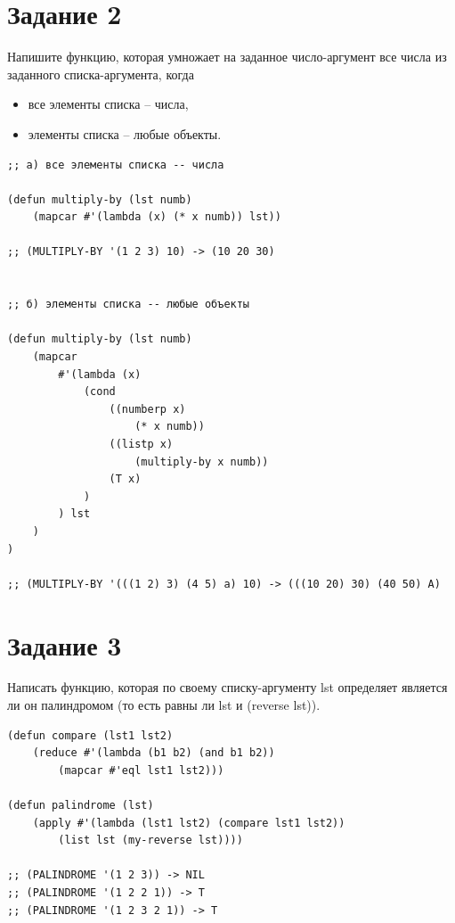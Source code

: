\documentclass[a4paper,14pt, unknownkeysallowed]{extreport}
\begin{document}
\section{Задание 2}

Напишите функцию, которая умножает на заданное число-аргумент все числа из заданного списка-аргумента, когда

\begin{itemize}
	\item все элементы списка -- числа,
	\item элементы списка -- любые объекты.
\end{itemize}

\begin{center}
\captionsetup{justification=raggedright,singlelinecheck=off}
\begin{lstlisting}[label=lst:parallel_processing,caption=Решение задания 2]
;; a) все элементы списка -- числа

(defun multiply-by (lst numb)
	(mapcar #'(lambda (x) (* x numb)) lst))

;; (MULTIPLY-BY '(1 2 3) 10) -> (10 20 30)


;; б) элементы списка -- любые объекты

(defun multiply-by (lst numb)
    (mapcar 
        #'(lambda (x) 
            (cond 
                ((numberp x)
                    (* x numb))
                ((listp x)
                    (multiply-by x numb))
                (T x)
            )
        ) lst
    )
)

;; (MULTIPLY-BY '(((1 2) 3) (4 5) a) 10) -> (((10 20) 30) (40 50) A)
\end{lstlisting}
\end{center}

\section{Задание 3}

Написать функцию, которая по своему списку-аргументу lst определяет является ли он палиндромом (то есть равны ли lst и (reverse lst)).

\begin{center}
\captionsetup{justification=raggedright,singlelinecheck=off}
\begin{lstlisting}[label=lst:parallel_processing,caption=Решение задания 3]
(defun compare (lst1 lst2)
    (reduce #'(lambda (b1 b2) (and b1 b2)) 
        (mapcar #'eql lst1 lst2)))

(defun palindrome (lst)
    (apply #'(lambda (lst1 lst2) (compare lst1 lst2)) 
        (list lst (my-reverse lst))))

;; (PALINDROME '(1 2 3)) -> NIL
;; (PALINDROME '(1 2 2 1)) -> T
;; (PALINDROME '(1 2 3 2 1)) -> T
\end{lstlisting}
\end{center}
\end{document}
